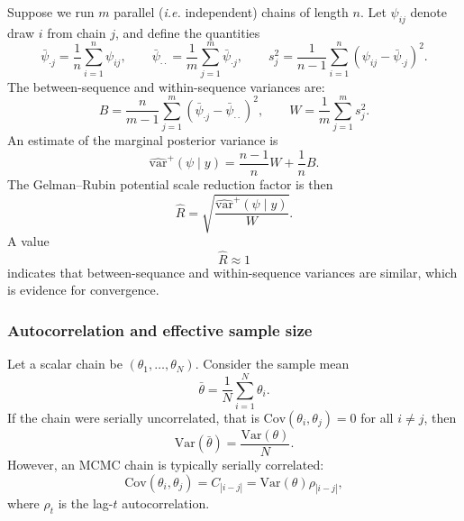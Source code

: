 \documentclass[11pt, titlepage]{article} %
\numberwithin{equation}{section}
\theoremstyle{definition}
\numberwithin{assumption}{section}
\begin{document}
Suppose we run $m$ parallel (\textit{i.e.} independent) chains of length $n$. Let $\psi_{ij}$ denote draw $i$ from chain $j$, and define the quantities
\begin{equation*}
    \bar\psi_{\cdot j}=\frac{1}{n}\sum_{i=1}^n \psi_{ij},
    \qquad
    \bar\psi_{\cdot\cdot}=\frac{1}{m}\sum_{j=1}^m \bar\psi_{\cdot j}, \qquad  s_j^2=\frac{1}{n-1}\sum_{i=1}^n (\psi_{ij}-\bar\psi_{\cdot j})^2.
\end{equation*}
The between-sequence and within-sequence variances are:
\begin{equation*}
    B=\frac{n}{m-1}\sum_{j=1}^m (\bar\psi_{\cdot j}-\bar\psi_{\cdot\cdot})^2, \qquad
    W=\frac{1}{m}\sum_{j=1}^m s_j^2.
\end{equation*}
An estimate of the marginal posterior variance is
\begin{equation*}
    \widehat{\mathrm{var}}^+(\psi\mid y)
    =
    \frac{n-1}{n}W+\frac{1}{n}B.
\end{equation*}
The Gelman--Rubin potential scale reduction factor is then
\begin{equation*}
    \hat R=\sqrt{\frac{\widehat{\mathrm{var}}^+(\psi\mid y)}{W}}.
\end{equation*}
A value
\begin{equation*}
    \hat R\approx 1
\end{equation*}
indicates that between-sequance and within-sequence variances are similar, which is evidence for convergence.



\subsubsection*{Autocorrelation and effective sample size}
Let a scalar chain be $(\theta_1,\dots,\theta_N)$. Consider the sample mean
\begin{equation*}
    \bar\theta=\frac{1}{N}\sum_{i=1}^N \theta_i.
\end{equation*}
If the chain were serially uncorrelated, that is $\mathrm{Cov}(\theta_i,\theta_j)=0$ for all $i\ne j$,
then
\begin{equation*}
    \mathrm{Var}(\bar\theta)=\frac{\mathrm{Var}(\theta)}{N}.
\end{equation*}
However, an MCMC chain is typically serially correlated:
\begin{equation*}
    \mathrm{Cov}(\theta_i,\theta_j)=C_{|i-j|}=\mathrm{Var}(\theta)\rho_{|i-j|},
\end{equation*}
where $\rho_t$ is the lag-$t$ autocorrelation.
\end{document}

